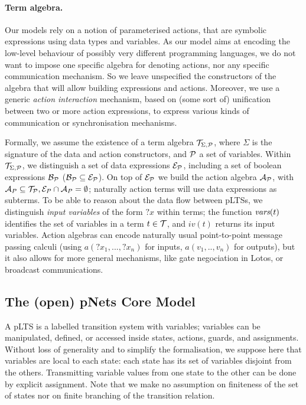 \documentclass{lncs/llncs}
\begin{document}
\paragraph*{Term algebra.}
Our models rely on a notion of parameterised actions, that are
symbolic expressions using data types and variables. As our model aims
at encoding the low-level behaviour of possibly very different
programming languages, we do not want to impose one specific algebra
for denoting actions, nor any specific communication mechanism. So we
leave unspecified the constructors of the algebra that will allow building
expressions and actions. Moreover, we use a generic {\em action interaction}
mechanism, based on (some sort of) unification between two or more action
expressions, to express various kinds of communication or
synchronisation mechanisms.

\def\Talg{\mathcal{T}_{\Sigma,\P}}
Formally, we assume the existence of a term algebra $\Talg$,
where $\Sigma$ is the signature of the data and action constructors,
and $\P$ a set of variables. Within $\Talg$, we distinguish a set of
data expressions $\mathcal{E}_\P$, including a set of boolean
expressions $\mathcal{B}_{\P}$ ($\mathcal{B}_{\P}\subseteq\mathcal{E}_\P$).
On top of $\mathcal{E}_\P$ we build the action algebra
$\mathcal{A}_\P$, with $\mathcal{A}_P\subseteq\mathcal{T}_\P,
\mathcal{E}_P\cap\mathcal{A}_P=\emptyset$;
naturally action terms will use data expressions as subterms.
To be able to reason about the data flow between pLTSs, we
distinguish \emph{input variables} of the form $?x$ within terms; the function
$\vars(t)$ identifies the set of variables in a term
$t\in\AlgT$, and $iv(t)$ returns its input variables.
Action algebras can encode naturally usual point-to-point message passing calculi (using 
$a(?x_1,...,?x_n)$ for inputs, $a(v_1,..,v_n)$ for outputs), but it also allows
for more general mechanisms, like gate negociation in Lotos, or broadcast
communications. 



\subsection{The (open) pNets Core Model}
\label{section:pNets}


A pLTS is a labelled transition system with variables; variables can be
manipulated, defined, or accessed inside states, actions, guards, and
assignments. Without loss of generality and to simplify the formalisation, we suppose 
here that variables are local to each 
state: each state has its set of variables disjoint from the others. Transmitting 
variable values from one state to the other can be done by explicit assignment. 
Note that we make no assumption on finiteness of the set of states nor
on finite branching of the transition relation.
\end{document}
